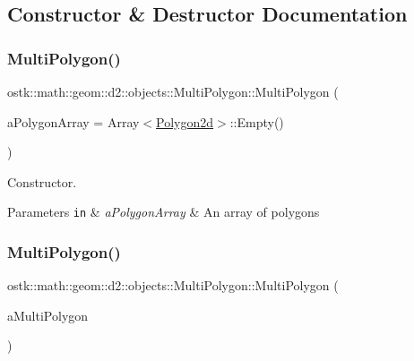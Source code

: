 \subsection{Constructor \& Destructor Documentation}
\mbox{\label{classostk_1_1math_1_1geom_1_1d2_1_1objects_1_1_multi_polygon_a70327c4d3f7f19f5ae9b32c0a715f1fd}} 
\subsubsection{\texorpdfstring{Multi\+Polygon()}{MultiPolygon()}\hspace{0.1cm}{\footnotesize\ttfamily [1/2]}}
{\footnotesize\ttfamily ostk\+::math\+::geom\+::d2\+::objects\+::\+Multi\+Polygon\+::\+Multi\+Polygon (\begin{DoxyParamCaption}\item[{const Array$<$ \hyperlink{namespaceostk_1_1math_1_1geom_1_1d2_1_1objects_a5786a3021d23f9c64937e263a2da9d27}{Polygon2d} $>$ \&}]{a\+Polygon\+Array = {\ttfamily Array$<$\hyperlink{namespaceostk_1_1math_1_1geom_1_1d2_1_1objects_a5786a3021d23f9c64937e263a2da9d27}{Polygon2d}$>$\+:\+:Empty()} }\end{DoxyParamCaption})}



Constructor. 


\begin{DoxyParams}[1]{Parameters}
\mbox{\tt in}  & {\em a\+Polygon\+Array} & An array of polygons \\
\hline
\end{DoxyParams}
\mbox{\label{classostk_1_1math_1_1geom_1_1d2_1_1objects_1_1_multi_polygon_ac5b053bb605f9c24de35f0e35e3b1ee8}} 
\subsubsection{\texorpdfstring{Multi\+Polygon()}{MultiPolygon()}\hspace{0.1cm}{\footnotesize\ttfamily [2/2]}}
{\footnotesize\ttfamily ostk\+::math\+::geom\+::d2\+::objects\+::\+Multi\+Polygon\+::\+Multi\+Polygon (\begin{DoxyParamCaption}\item[{const \hyperlink{classostk_1_1math_1_1geom_1_1d2_1_1objects_1_1_multi_polygon}{Multi\+Polygon} \&}]{a\+Multi\+Polygon }\end{DoxyParamCaption})}



